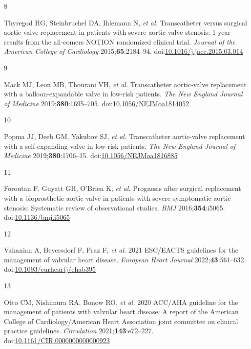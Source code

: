 \documentclass[
  12pt,
]{article}
\newlength{\cslhangindent}
\newlength{\csllabelwidth}
\newenvironment{CSLReferences}[2] %
 {\begin{list}{}{%
  \setlength{\itemindent}{0pt}
  \setlength{\leftmargin}{0pt}
  \setlength{\parsep}{0pt}
  \ifodd #1
   \setlength{\leftmargin}{\cslhangindent}
   \setlength{\itemindent}{-1\cslhangindent}
  \fi
  \setlength{\itemsep}{#2\baselineskip}}}
 {\end{list}}
\newcommand{\CSLLeftMargin}[1]{\parbox[t]{\csllabelwidth}{\strut#1\strut}}
\newcommand{\CSLRightInline}[1]{\parbox[t]{\linewidth - \csllabelwidth}{\strut#1\strut}}
\begin{document}
\begin{CSLReferences}{0}{1}
\CSLLeftMargin{8 }%
\CSLRightInline{Thyregod HG, Steinbruchel DA, Ihlemann N, \emph{et al.}
Transcatheter versus surgical aortic valve replacement in patients with
severe aortic valve stenosis: 1-year results from the all-comers
{NOTION} randomized clinical trial. \emph{Journal of the American
College of Cardiology} 2015;\textbf{65}:2184--94.
doi:\href{https://doi.org/10.1016/j.jacc.2015.03.014}{10.1016/j.jacc.2015.03.014}}

\CSLLeftMargin{9 }%
\CSLRightInline{Mack MJ, Leon MB, Thourani VH, \emph{et al.}
Transcatheter aortic-valve replacement with a balloon-expandable valve
in low-risk patients. \emph{The New England Journal of Medicine}
2019;\textbf{380}:1695--705.
doi:\href{https://doi.org/10.1056/NEJMoa1814052}{10.1056/NEJMoa1814052}}

\CSLLeftMargin{10 }%
\CSLRightInline{Popma JJ, Deeb GM, Yakubov SJ, \emph{et al.}
Transcatheter aortic-valve replacement with a self-expanding valve in
low-risk patients. \emph{The New England Journal of Medicine}
2019;\textbf{380}:1706--15.
doi:\href{https://doi.org/10.1056/NEJMoa1816885}{10.1056/NEJMoa1816885}}

\CSLLeftMargin{11 }%
\CSLRightInline{Foroutan F, Guyatt GH, O'Brien K, \emph{et al.}
Prognosis after surgical replacement with a bioprosthetic aortic valve
in patients with severe symptomatic aortic stenosis: Systematic review
of observational studies. \emph{BMJ} 2016;\textbf{354}:i5065.
doi:\href{https://doi.org/10.1136/bmj.i5065}{10.1136/bmj.i5065}}

\CSLLeftMargin{12 }%
\CSLRightInline{Vahanian A, Beyersdorf F, Praz F, \emph{et al.} 2021
{ESC}/{EACTS} guidelines for the management of valvular heart disease.
\emph{European Heart Journal} 2022;\textbf{43}:561--632.
doi:\href{https://doi.org/10.1093/eurheartj/ehab395}{10.1093/eurheartj/ehab395}}

\CSLLeftMargin{13 }%
\CSLRightInline{Otto CM, Nishimura RA, Bonow RO, \emph{et al.} 2020
{ACC}/{AHA} guideline for the management of patients with valvular heart
disease: A report of the {American} {College} of {Cardiology}/{American}
{Heart} {Association} joint committee on clinical practice guidelines.
\emph{Circulation} 2021;\textbf{143}:e72--227.
doi:\href{https://doi.org/10.1161/CIR.0000000000000923}{10.1161/CIR.0000000000000923}}


\end{CSLReferences}
\end{document}
